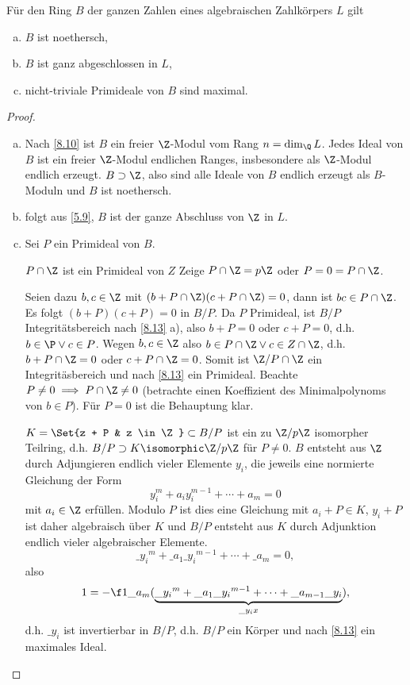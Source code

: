 \begin{st} \label{8.15}
	Für den Ring $B$ der ganzen Zahlen eines algebraischen Zahlkörpers $L$ gilt
	\begin{enumerate}[a)]
		\item
			$B$ ist noethersch,
		\item
			$B$ ist ganz abgeschlossen in $L$,
		\item
			nicht-triviale Primideale von $B$ sind maximal.
	\end{enumerate}
	\begin{proof}
		\begin{enumerate}[a)]
			\item
				Nach \ref{8.10} ist $B$ ein freier $\Z$-Modul vom Rang $n = \dim_\Q L$.
				Jedes Ideal von $B$ ist ein freier $\Z$-Modul endlichen Ranges, insbesondere als $\Z$-Modul endlich erzeugt.
				$B \supset \Z$, also sind alle Ideale von $B$ endlich erzeugt als $B$-Moduln und $B$ ist noethersch.
			\item
				folgt aus \ref{5.9}, $B$ ist der ganze Abschluss von $\Z$ in $L$.
			\item
				Sei $P$ ein Primideal von $B$.
				\begin{seg}{$P \cap \Z$ ist ein Primideal von $Z$}
					Zeige $P \cap \Z = p\Z$ oder $P = 0 = P \cap \Z$.

					Seien dazu $b,c \in \Z$ mit $(b + P \cap \Z)(c + P \cap \Z) = 0$, dann ist $bc \in P \cap \Z$.
					Es folgt $(b + P)(c + P) = 0$ in $B / P$.
					Da $P$ Primideal, ist $B / P$ Integritätsbereich nach \ref{8.13} a), also $b + P = 0$ oder $c + P = 0$, d.h. $b \in \P \lor c \in P$.
					Wegen $b,c \in \Z$ also $b \in P \cap \Z \lor c \in Z \cap \Z$, d.h. $b + P\cap\Z = 0$ oder $c + P\cap \Z = 0$.
					Somit ist $\Z / P \cap \Z$ ein Integritäsbereich und nach \ref{8.13} ein Primideal.
					Beachte $P \neq 0 \implies P \cap \Z \neq 0$ (betrachte einen Koeffizient des Minimalpolynoms von $b \in P$).
					Für $P = 0$ ist die Behauptung klar.
				\end{seg}
				$K = \Set{z + P & z \in \Z} \subset B / P$ ist ein zu $\Z / p \Z$ isomorpher Teilring, d.h. $B / P \supset K \isomorphic \Z / p \Z$ für $P \neq 0$.
				$B$ entsteht aus $\Z$ durch Adjungieren endlich vieler Elemente $y_i$, die jeweils eine normierte Gleichung der Form
				\[
					y_i^m + a_i y_i^{m-1} + \dotsb + a_m = 0
				\]
				mit $a_i \in \Z$ erfüllen.
				Modulo $P$ ist dies eine Gleichung mit $a_i + P \in K$, $y_i + P$ ist daher algebraisch über $K$ und $B / P$ entsteht aus $K$ durch Adjunktion endlich vieler algebraischer Elemente.
				\[
					\_{y_i}^m + \_{a_1}\_{y_i}^{m-1} + \dotsb + \_{a_m} = 0,
				\]
				also
				\[
					1 = - \f 1{\_{a_m}}(\underbrace{\_{y_i}^m + \_{a_1}\_{y_i}^{m-1} + \dotsb + \_{a_{m-1}}\_{y_i}}_{\_{y_i} x}),
				\]
				d.h. $\_{y_i}$ ist invertierbar in $B / P$, d.h. $B/P$ ein Körper und nach \ref{8.13} ein maximales Ideal.
		\end{enumerate}
	\end{proof}
\end{st}

